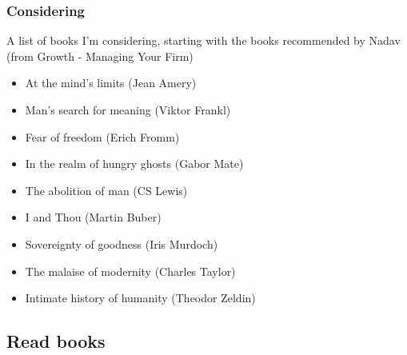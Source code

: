 \documentclass[12pt,a4paper]{article}
\begin{document}
\subsubsection{Considering}
A list of books I'm considering, starting with the books recommended by Nadav (from Growth - Managing Your Firm)
\begin{itemize}
\item At the mind’s limits (Jean Amery)
\item Man’s search for meaning (Viktor Frankl)
\item Fear of freedom (Erich Fromm)
\item In the realm of hungry ghosts (Gabor Mate)
\item The abolition of man (CS Lewis)
\item I and Thou (Martin Buber)
\item Sovereignty of goodness (Iris Murdoch)
\item The malaise of modernity (Charles Taylor)
\item Intimate history of humanity (Theodor Zeldin)
\end{itemize}

\subsection{Read books}
\end{document}
